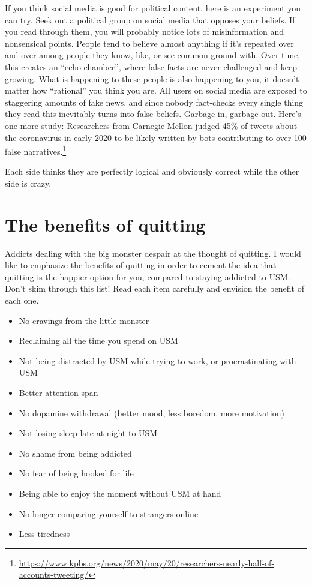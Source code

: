 \documentclass[
  openany]{book}
\providecommand{\tightlist}{%
  \setlength{\itemsep}{0pt}\setlength{\parskip}{0pt}}
\begin{document}
If you think social media is good for political content, here is an experiment you can try. Seek out a political group on social media that opposes your beliefs. If you read through them, you will probably notice lots of misinformation and nonsensical points. People tend to believe almost anything if it's repeated over and over among people they know, like, or see common ground with. Over time, this creates an ``echo chamber'', where false facts are never challenged and keep growing. What is happening to these people is also happening to you, it doesn't matter how ``rational'' you think you are. All users on social media are exposed to staggering amounts of fake news, and since nobody fact-checks every single thing they read this inevitably turns into false beliefs. Garbage in, garbage out. Here's one more study: Researchers from Carnegie Mellon judged 45\% of tweets about the coronavirus in early 2020 to be likely written by bots contributing to over 100 false narratives.\footnote{\url{https://www.kpbs.org/news/2020/may/20/researchers-nearly-half-of-accounts-tweeting/}}

Each side thinks they are perfectly logical and obviously correct while the other side is crazy.

\section{The benefits of quitting}\label{the-benefits-of-quitting}

Addicts dealing with the big monster despair at the thought of quitting. I would like to emphasize the benefits of quitting in order to cement the idea that quitting is the happier option for you, compared to staying addicted to USM. Don't skim through this list! Read each item carefully and envision the benefit of each one.

\begin{itemize}
\tightlist
\item
  No cravings from the little monster
\item
  Reclaiming all the time you spend on USM
\item
  Not being distracted by USM while trying to work, or procrastinating with USM
\item
  Better attention span
\item
  No dopamine withdrawal (better mood, less boredom, more motivation)
\item
  Not losing sleep late at night to USM
\item
  No shame from being addicted
\item
  No fear of being hooked for life
\item
  Being able to enjoy the moment without USM at hand
\item
  No longer comparing yourself to strangers online
\item
  Less tiredness
\end{itemize}
\end{document}
